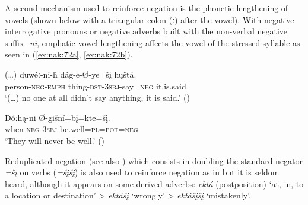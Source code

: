\documentclass[output=paper,colorlinks,citecolor=brown]{langscibook}
\begin{document}

A second mechanism used to reinforce negation is the phonetic lengthening of vowels (shown below with a triangular colon (ː) after the vowel). With negative interrogative pronouns or negative adverbs built with the non-verbal negative suffix \textit{-ni}, emphatic vowel lengthening affects the vowel of the stressed syllable as seen in (\ref{ex:nak:72a}, \ref{ex:nak:72b}).

\ea\label{ex:nak:72}
    \ea\label{ex:nak:72a}
        \gll (…) duwéː-ni-ȟ dág-e-Ø-ye=šį hųštá. \\
             {} person-\textsc{neg-emph} thing-\textsc{dst}-\textsc{3sbj}-say=\textsc{neg} it.is.said \\
        \glt ‘(…) no one at all didn’t say anything, it is said.’ (\citealt[74]{ParksDeMallie2012a})
    
    \ex\label{ex:nak:72b}
        \gll Dóːhą-ni Ø-gišní=bį=kte=šį. \\
             when-\textsc{neg} \textsc{3sbj}-be.well=\textsc{pl=pot=neg} \\
        \glt ‘They will never be well.’ (\citealt[52]{ParksDeMallie2012a})
    \z
\z 

Reduplicated negation (see also \citealt[105]{BoasDeloria1941}) which consists in doubling the standard negator \textit{=šį} on verbs (\textit{=šįšį}) is also used to reinforce negation as in  but it is seldom heard, although it appears on some derived adverbs: \textit{ektá} (postposition) ‘at, in, to a location or destination’ > \textit{ektášį} ‘wrongly’ > \textit{ektášįšį} ‘mistakenly’.
\end{document}

